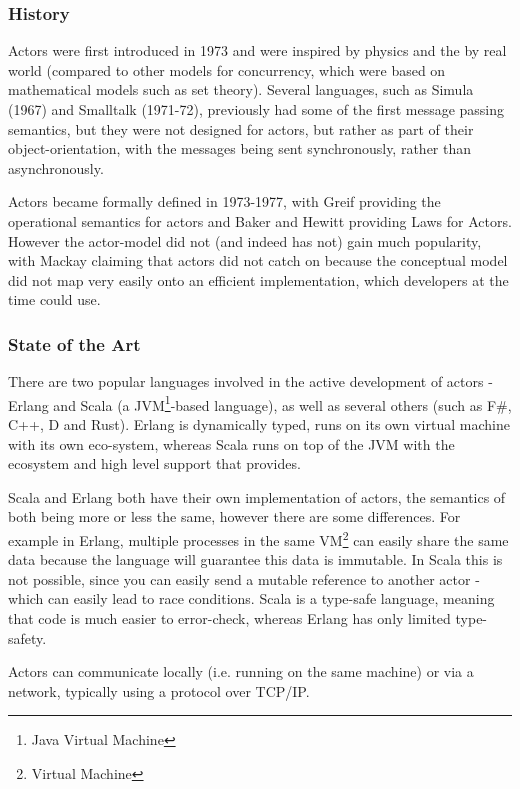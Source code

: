 \documentclass{article}
\begin{document}
\subsubsection{History}

Actors were first introduced in 1973\cite{hewitt1973} and were inspired by
physics and the by real world (compared to other models for concurrency, which
were based on mathematical models such as set theory). Several languages, such
as Simula (1967) and Smalltalk (1971-72), previously had some of the first
message passing semantics, but they were not designed for actors, but rather as
part of their object-orientation, with the messages being sent synchronously, rather
than asynchronously.

Actors became formally defined in 1973-1977, with Greif providing the
operational semantics for actors\cite{grief1975} and Baker and Hewitt providing
Laws for Actors\cite{hewitt1977}. However the actor-model did not (and
indeed has not) gain much popularity, with Mackay\cite{mackay97} claiming that
actors did not catch on because the conceptual model did not map very easily
onto an efficient implementation, which developers at the time could use.

\subsubsection{State of the Art}

There are two popular languages involved in the active development of actors -
Erlang and Scala (a JVM\footnote{Java Virtual Machine}-based language), as well
as several others (such as F\#, C++, D and Rust). Erlang is dynamically typed,
runs on its own virtual machine with its own eco-system, whereas Scala runs on
top of the JVM with the ecosystem and high level support that provides.

Scala and Erlang both have their own implementation of actors, the semantics
of both being more or less the same, however there are some differences. For
example in Erlang, multiple processes in the same VM\footnote{Virtual Machine}
can easily share the same data because the language will guarantee this data is
immutable. In Scala this is not possible, since you can easily send a mutable
reference to another actor - which can easily lead to race conditions. Scala is
a type-safe language, meaning that code is much easier to error-check, whereas
Erlang has only limited type-safety.

Actors can communicate locally (i.e. running on the same machine) or via a
network, typically using a protocol over TCP/IP.
\end{document}
